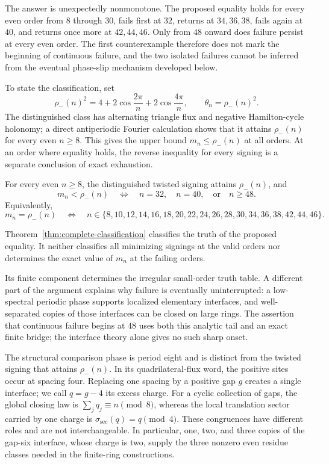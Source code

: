 The answer is unexpectedly nonmonotone.  The proposed equality holds for
every even order from \(8\) through \(30\), fails first at \(32\), returns at
\(34,36,38\), fails again at \(40\), and returns once more at \(42,44,46\).
Only from \(48\) onward does failure persist at every even order.  The first
counterexample therefore does not mark the beginning of continuous failure,
and the two isolated failures cannot be inferred from the eventual
phase-slip mechanism developed below.

To state the classification, set
\[
\rho_-(n)^2
=4+2\cos\frac{2\pi}{n}+2\cos\frac{4\pi}{n},
\qquad
\theta_n=\rho_-(n)^2.
\]
The distinguished class has alternating triangle flux and negative
Hamilton-cycle holonomy; a direct antiperiodic Fourier calculation shows that
it attains \(\rho_-(n)\) for every even \(n\geq8\).  This gives the upper
bound \(m_n\leq\rho_-(n)\) at all orders.  At an order where equality holds,
the reverse inequality for every signing is a separate conclusion of exact
exhaustion.

\begin{theorem}\label{thm:complete-classification}
For every even \(n\geq8\), the distinguished twisted signing attains
\(\rho_-(n)\), and
\[
m_n<\rho_-(n)
\quad\Longleftrightarrow\quad
n=32,\quad n=40,\quad\text{or}\quad n\geq48.
\]
Equivalently,
\[
m_n=\rho_-(n)
\quad\Longleftrightarrow\quad
n\in\{8,10,12,14,16,18,20,22,24,26,28,30,34,36,38,42,44,46\}.
\]
\end{theorem}

Theorem~\ref{thm:complete-classification} classifies the truth of the
proposed equality.  It neither classifies all minimizing signings at the
valid orders nor determines the exact value of \(m_n\) at the failing orders.

Its finite component determines the irregular small-order truth table.  A
different part of the argument explains why failure is eventually
uninterrupted: a low-spectral periodic phase supports localized elementary
interfaces, and well-separated copies of those interfaces can be closed on
large rings.  The assertion that continuous failure begins at \(48\) uses
both this analytic tail and an exact finite bridge; the interface theory
alone gives no such sharp onset.

The structural comparison phase is period eight and is distinct from the
twisted signing that attains \(\rho_-(n)\).  In its quadrilateral-flux word,
the positive sites occur at spacing four.  Replacing one spacing by a
positive gap \(g\) creates a single interface; we call \(q=g-4\) its excess
charge.  For a cyclic collection of gaps, the global closing law is
\(\sum_j q_j\equiv n\pmod 8\), whereas the local translation sector carried
by one charge is \(\sigma_{\mathrm{sec}}(q)=q\pmod4\).  These congruences have
different roles and are not interchangeable.  In particular, one, two, and
three copies of the gap-six interface, whose charge is two, supply the three
nonzero even residue classes needed in the finite-ring constructions.

